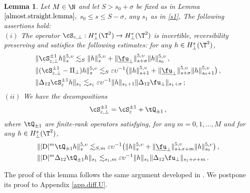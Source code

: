 \documentclass[a4paper,reqno,10pt]{article}
\newtheorem{lem}{Lemma}[section]
\begin{document}
	\begin{lem}\label{Lema-decompMon.eps}
	Let $M\in\N$ and let $S>s_0+\sigma$ be fixed as in Lemma $\ref{almost.straight.lemma},$  $s_0 \leq s \leq S-\sigma$, any $s_1$ as in \eqref{s1}, The following assertions hold:
    \\[1mm]
    \noindent $(i)$ The operator
	$\displaystyle{
		\cS_{\varepsilon,\perp} : H_{\perp}^{s}(\T^2) \to H_{\perp}^{s}(\T^2)}$
	is  invertible, reversibility preserving and  satisfies the following estimates:  for any $h \in H_{\perp}^{s}(\T^2)$,
	\begin{align*}
		&	\| \cS_{\varepsilon,\perp}^{\pm 1}h \|_{s}^{5,\upsilon} \lesssim_{S} \| h \|_{s}^{5,\upsilon} +  \| \underline{\fu}_{\perp} \|_{s+\sigma}^{5,\upsilon}  \| h\|_{s_0}^{5,\upsilon} \,,  \\
		\nonumber&	\| (\cS_{\varepsilon,\perp}^{\pm 1}-\Pi_{\perp}) h \|_{s}^{5,\upsilon} \lesssim_{S} \varepsilon\upsilon^{-1} \big(  \| h \|_{s+1}^{5,\upsilon} + \| \underline{\fu}_{\perp} \|_{s+\sigma}^{5,\upsilon}  \| h \|_{s_0+1}^{5,\upsilon} \big) \,,   \\
		\nonumber& \| \Delta_{12} \cS_{\varepsilon}^{\pm 1} h \|_{s_1} \lesssim_{s_1} \varepsilon \upsilon^{-1}  \| h \|_{s_1+1}\| \Delta_{12}\fu_{\perp} \|_{s_1+\sigma} \,; 
	\end{align*}
    \noindent $(ii)$
		We have the decompositions
        \begin{align}
            \cS_{\varepsilon,\perp}^{\pm1} = \cS_{\varepsilon}^{\pm1} + \tQ_{\pm 1}\,, 
        \end{align}
        where $\tQ_{\pm 1}$  are finite-rank operators satisfying, for any $m=0,1,...,M$ and  for any $h \in H_{\perp}^{s}(\T^2)$,
	\begin{align}
		&	\||{\rm D}|^{m} \tQ_{\pm1} h \|_{s}^{5,\upsilon} \lesssim_{S,m} \varepsilon\upsilon^{-1} \big(  \| h \|_{s}^{5,\upsilon} + \| \underline{\fu}_{\perp} \|_{s+\sigma+m}^{5,\upsilon}  \| h \|_{s_0}^{5,\upsilon}\big) \,,  \label{est.tQ} \\
	& \||{\rm D}|^{m} \Delta_{12}\tQ_{\pm1} h \|_{s_1} \lesssim_{s_1,m} \varepsilon \upsilon^{-1}  \| h \|_{s_1}\| \Delta_{12}\fu_{\perp} \|_{s_1+\sigma+m} \,. \label{est.tQ.12}
	\end{align}
\end{lem}

The proof of this lemma follows the same argument developed in  \cite[Lemma 6.3]{HR21}. We postpone its proof to Appendix \ref{app.diff.U}.

\medskip
\end{document}

